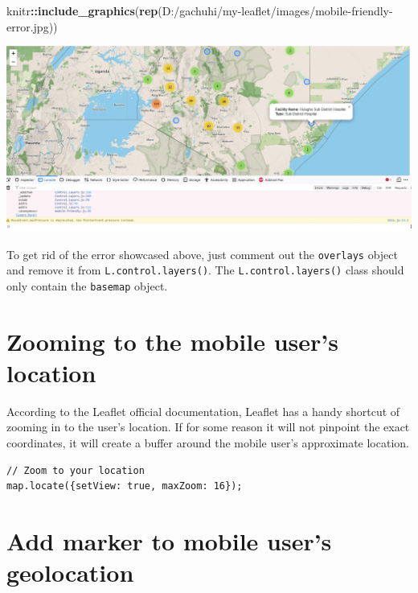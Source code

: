 \documentclass[
]{book}
\newenvironment{Shaded}{\begin{snugshade}}{\end{snugshade}}
\newcommand{\FunctionTok}[1]{\textcolor[rgb]{0.13,0.29,0.53}{\textbf{#1}}}
\newcommand{\NormalTok}[1]{#1}
\newcommand{\SpecialCharTok}[1]{\textcolor[rgb]{0.81,0.36,0.00}{\textbf{#1}}}
\newcommand{\StringTok}[1]{\textcolor[rgb]{0.31,0.60,0.02}{#1}}
\begin{document}
\begin{Shaded}
\begin{Highlighting}[]
\NormalTok{knitr}\SpecialCharTok{::}\FunctionTok{include\_graphics}\NormalTok{(}\FunctionTok{rep}\NormalTok{(}\StringTok{\textquotesingle{}D:/gachuhi/my{-}leaflet/images/mobile{-}friendly{-}error.jpg\textquotesingle{}}\NormalTok{))}
\end{Highlighting}
\end{Shaded}

\includegraphics{../images/mobile-friendly-error.jpg}

To get rid of the error showcased above, just comment out the \texttt{overlays} object and remove it from \texttt{L.control.layers()}. The \texttt{L.control.layers()} class should only contain the \texttt{basemap} object.

\hypertarget{zooming-to-the-mobile-users-location}{%
\section{Zooming to the mobile user's location}\label{zooming-to-the-mobile-users-location}}

According to the Leaflet official documentation, Leaflet has a handy shortcut of zooming in to the user's location. If for some reason it will not pinpoint the exact coordinates, it will create a buffer around the mobile user's approximate location.

\begin{verbatim}
// Zoom to your location
map.locate({setView: true, maxZoom: 16});
\end{verbatim}

\hypertarget{add-marker-to-mobile-users-geolocation}{%
\section{Add marker to mobile user's geolocation}\label{add-marker-to-mobile-users-geolocation}}
\end{document}
